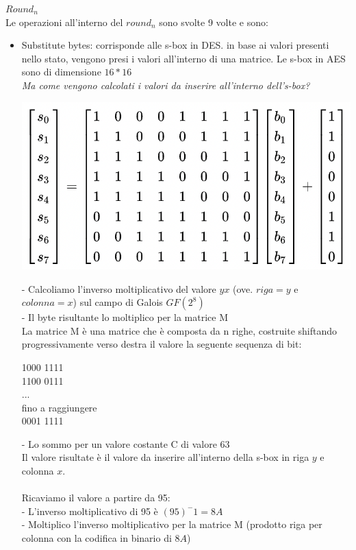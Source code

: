 \documentclass[11pt, oneside]{article}   	%
\begin{document}
\emph{$Round_n$}\\
Le operazioni all'interno del $round_n$ sono svolte 9 volte e sono:
\begin{itemize}
\item Substitute bytes: corrisponde alle s-box in DES. in base ai valori presenti nello stato, vengono presi i valori all'interno di una matrice. Le s-box in AES sono di dimensione $16 * 16$\\
\emph{Ma come vengono calcolati i valori da inserire all'interno dell's-box?}
\begin{center}
\includegraphics[scale= 0.4]{aesbox}
\end{center}
- Calcoliamo l'inverso moltiplicativo del valore $yx$ (ove. $riga = y$ e $colonna = x$) sul campo di Galois $GF(2^8)$\\
- Il byte risultante lo moltiplico per la matrice M\\
La matrice M è una matrice che è composta da n righe, costruite shiftando progressivamente verso destra il valore la seguente sequenza di bit: \begin{center}
1000 1111\\
1100 0111\\
...\\
fino a raggiungere\\
0001 1111
\end{center}
- Lo sommo per un valore costante C di valore 63\\
Il valore risultate è il valore da inserire all'interno della s-box in riga $y$ e colonna $x$.\\\\
Ricaviamo il valore a partire da 95:\\
- L'inverso moltiplicativo di 95  è $({95})^-1 = 8A$ \\
- Moltiplico l'inverso moltiplicativo per la matrice M (prodotto riga per colonna con la codifica in binario di $8A$)\\

\end{itemize}
\end{document}
